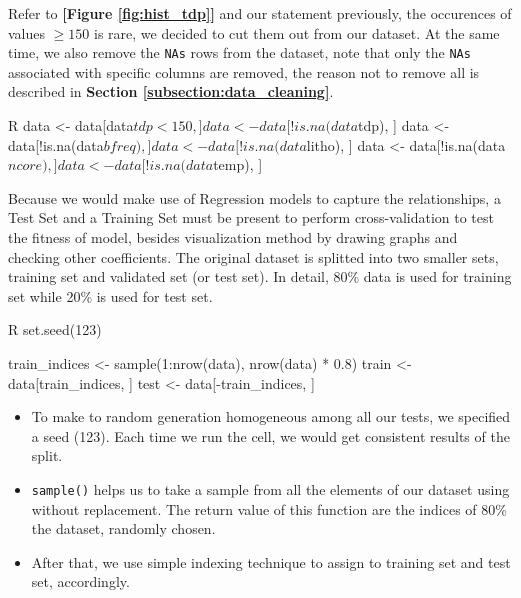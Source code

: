 Refer to \textbf{[Figure \ref{fig:hist_tdp}]} and our statement previously, the occurences of values $\ge 150$ is rare, we decided to
cut them out from our dataset. At the same time, we also remove the \texttt{NAs} rows from the dataset, note that only the
\texttt{NAs} associated with specific columns are removed, the reason not to remove all is described in \textbf{Section \ref{subsection:data_cleaning}}.

\begin{code}{R}
    data <- data[data$tdp < 150, ]
    data <- data[!is.na(data$tdp), ]
    data <- data[!is.na(data$bfreq), ]
    data <- data[!is.na(data$litho), ]
    data <- data[!is.na(data$ncore), ]
    data <- data[!is.na(data$temp), ]
\end{code}

Because we would make use of Regression models to capture the relationships, a Test Set and a Training Set must be present to perform 
cross-validation to test the fitness of model, besides visualization method by drawing graphs and checking other coefficients. The original
dataset is splitted into two smaller sets, training set and validated set (or test set). In detail, 80\% data is used for training set while 20\% 
is used for test set.

\begin{code}{R}
set.seed(123)

train_indices <- sample(1:nrow(data), nrow(data) * 0.8)
train <- data[train_indices, ]
test <- data[-train_indices, ]
\end{code}

\begin{itemize}
    \item To make to random generation homogeneous among all our tests, we specified a seed (123). Each time we run the cell, we would get
    consistent results of the split.
    \item \verb|sample()| helps us to take a sample from all the elements of our dataset using without replacement. The return value of this function
    are the indices of 80\% the dataset, randomly chosen.
    \item After that, we use simple indexing technique to assign to training set and test set, accordingly.
\end{itemize}











